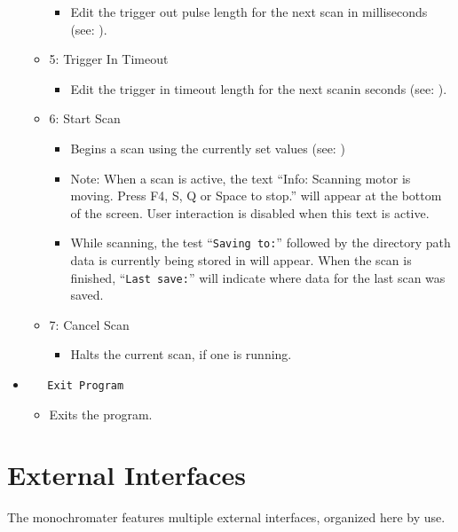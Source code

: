 \documentclass{article}
\begin{document}
\begin{itemize}
\begin{itemize}
        \begin{itemize}
            \item Edit the trigger out pulse length for the next scan in milliseconds (see: ).
        \end{itemize}
        \item 5: Trigger In Timeout
        \begin{itemize}
            \item Edit the trigger in timeout length for the next scanin seconds (see: ).
        \end{itemize}
        \item 6: Start Scan
        \begin{itemize}
            \item Begins a scan using the currently set values (see: )
            \item Note: When a scan is active, the text ``Info: Scanning motor is moving. Press F4, S, Q or Space to stop.'' will appear at the bottom of the screen. User interaction is disabled when this text is active.
            \item While scanning, the test ``\verb|Saving to:|'' followed by the directory path data is currently being stored in will appear. When the scan is finished, ``\verb|Last save:|'' will indicate where data for the last scan was saved.
        \end{itemize}
        \item 7: Cancel Scan
        \begin{itemize}
            \item Halts the current scan, if one is running.
        \end{itemize}
    \end{itemize}
    \item \verb|   Exit Program|
    \begin{itemize}
        \item Exits the program.
    \end{itemize}
\end{itemize}


\section{External Interfaces} \label{section:externalinterfaces}

The monochromater features multiple external interfaces, organized here by use.
\end{document}
